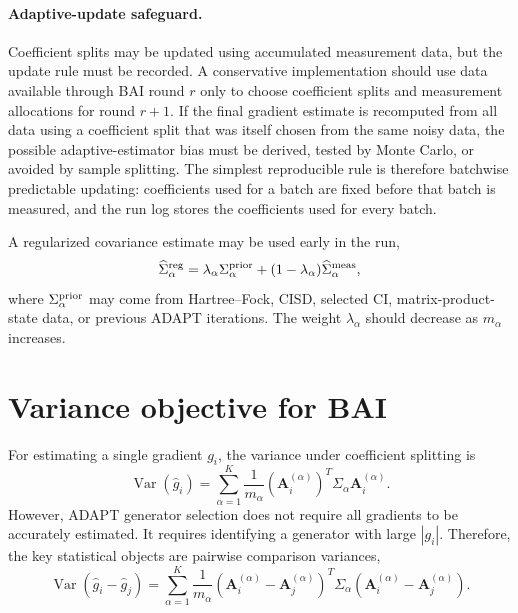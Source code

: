 \documentclass[11pt]{article}
\newcommand{\Var}{\operatorname{Var}}
\begin{document}
\paragraph{Adaptive-update safeguard.}
Coefficient splits may be updated using accumulated measurement data, but the update rule must be recorded. A conservative implementation should use data available through BAI round $r$ only to choose coefficient splits and measurement allocations for round $r+1$. If the final gradient estimate is recomputed from all data using a coefficient split that was itself chosen from the same noisy data, the possible adaptive-estimator bias must be derived, tested by Monte Carlo, or avoided by sample splitting. The simplest reproducible rule is therefore batchwise predictable updating: coefficients used for a batch are fixed before that batch is measured, and the run log stores the coefficients used for every batch.

A regularized covariance estimate may be used early in the run,
\begin{equation}
    \widehat\Sigma^{\rm reg}_\alpha
    =
    \lambda_\alpha\Sigma^{\rm prior}_\alpha
    +
    (1-\lambda_\alpha)\widehat\Sigma^{\rm meas}_\alpha,
    \label{eq:regularized-covariance}
\end{equation}
where $\Sigma^{\rm prior}_\alpha$ may come from Hartree--Fock, CISD, selected CI, matrix-product-state data, or previous ADAPT iterations. The weight $\lambda_\alpha$ should decrease as $m_\alpha$ increases.

\section{Variance objective for BAI}

For estimating a single gradient $g_i$, the variance under coefficient splitting is
\begin{equation}
    \Var(\widehat g_i)
    =
    \sum_{\alpha=1}^{K}
    \frac{1}{m_\alpha}
    \left(\bm A_i^{(\alpha)}\right)^T
    \Sigma_\alpha
    \bm A_i^{(\alpha)}.
    \label{eq:gradient-variance}
\end{equation}
However, ADAPT generator selection does not require all gradients to be accurately estimated. It requires identifying a generator with large $|g_i|$. Therefore, the key statistical objects are pairwise comparison variances,
\begin{equation}
    \Var(\widehat g_i-\widehat g_j)
    =
    \sum_{\alpha=1}^{K}
    \frac{1}{m_\alpha}
    \left(\bm A_i^{(\alpha)}-\bm A_j^{(\alpha)}\right)^T
    \Sigma_\alpha
    \left(\bm A_i^{(\alpha)}-\bm A_j^{(\alpha)}\right).
    \label{eq:pairwise-variance}
\end{equation}
\end{document}
